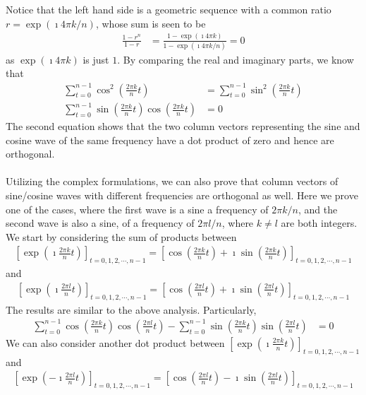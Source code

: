 Notice that the left hand side is a geometric sequence with a common ratio $r = \exp(\imath 4\pi k/n)$, whose sum is seen to be
\begin{align*}
\frac{1-r^n}{1-r} &= \frac{1 - \exp(\imath 4\pi k)}{1 - \exp(\imath 4\pi k/n)} = 0
\end{align*}
as $\exp(\imath 4\pi k)$ is just $1$. By comparing the real and imaginary parts, we know that
\begin{align*}
\sum_{t=0}^{n-1} \cos^2(\frac{2\pi k}{n} t) &= \sum_{t=0}^{n-1} \sin^2(\frac{2\pi k}{n} t) \\
\sum_{t=0}^{n-1} \sin(\frac{2\pi k}{n} t)\cos(\frac{2\pi k}{n} t) &= 0
\end{align*}
The second equation shows that the two column vectors representing the sine and cosine wave of the same frequency have a dot product of zero and hence are orthogonal.\\
\\
Utilizing the complex formulations, we can also prove that column vectors of sine/cosine waves with different frequencies are orthogonal as well. Here we prove one of the cases, where the first wave is a sine a frequency of $2\pi k/n$, and the second wave is also a sine, of a frequency of $2\pi l/n$, where $k \neq l$ are both integers. We start by considering the sum of products between
\begin{align*}
\left[\exp(\imath \frac{2\pi k}{n} t)\right]_{t = 0,1,2,\cdots,n-1} = \left[\cos(\frac{2\pi k}{n} t) + \imath\sin(\frac{2\pi k}{n} t) \right]_{t = 0,1,2,\cdots,n-1}   
\end{align*}
and
\begin{align*}
\left[\exp(\imath \frac{2\pi l}{n} t)\right]_{t = 0,1,2,\cdots,n-1} = \left[\cos(\frac{2\pi l}{n} t) + \imath\sin(\frac{2\pi l}{n} t) \right]_{t = 0,1,2,\cdots,n-1}   
\end{align*}
The results are similar to the above analysis. Particularly,
\begin{align*}
\sum_{t=0}^{n-1} \cos(\frac{2\pi k}{n} t)\cos(\frac{2\pi l}{n} t) - \sum_{t=0}^{n-1} \sin(\frac{2\pi k}{n} t)\sin(\frac{2\pi l}{n} t) &= 0 
\end{align*}
We can also consider another dot product between $\left[\exp(\imath \frac{2\pi k}{n} t)\right]_{t = 0,1,2,\cdots,n-1}$ and
\begin{align*}
\left[\exp(-\imath \frac{2\pi l}{n} t)\right]_{t = 0,1,2,\cdots,n-1} = \left[\cos(\frac{2\pi l}{n} t) - \imath\sin(\frac{2\pi l}{n} t) \right]_{t = 0,1,2,\cdots,n-1}       
\end{align*}
